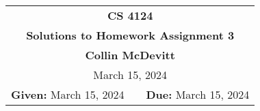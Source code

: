 \documentclass[11pt,twoside]{article}
\newcommand{\coursenumber}{CS 4124}
\newcommand{\docdate}{February 15, 2024}
\newcommand{\duedate}{March 15, 2024}
\newcommand{\homeworknumber}{3}
\newcommand{\doctitle}{Solutions to Homework Assignment \homeworknumber}
\newcommand{\doctitle}{Homework Assignment \homeworknumber}
\renewcommand{\docdate}{\duedate}
\renewcommand{\author}{Collin McDevitt}
\begin{document}
\thispagestyle{empty}

\begin{center}
\begin{tabular}{lcr}
\multicolumn{3}{c}{\Large\textbf{\coursenumber}}
\\[0.04in]
\multicolumn{3}{c}{\Large\textbf{\doctitle}}
\ifthenelse{\boolean{solutions}}{%
\\[0.04in]\multicolumn{3}{c}{\large\textbf{\author}}
}{} %
\ifthenelse{\boolean{solutions}}{%
\\[0.10in]\multicolumn{3}{c}{\duedate}
}{%
\\[0.10in]
\textbf{Given:} \docdate
& \hspace*{1.0in} &
\textbf{Due:} \duedate
}
\end{tabular}
\end{center}
\end{document}
